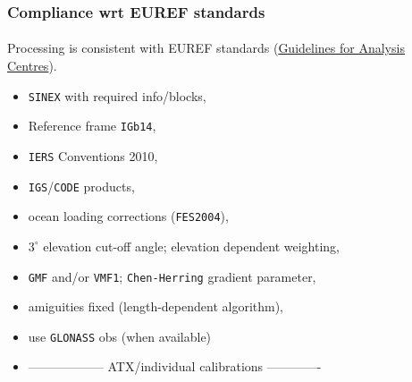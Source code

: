 \begin{frame}\frametitle{Compliance wrt EUREF standards}\framesubtitle{}
\vskip-1.5cm
  Processing is consistent with EUREF standards (\href{http://www.epncb.oma.be/_documentation/guidelines/guidelines_analysis_centres.pdf}{Guidelines for Analysis Centres}).
  \begin{itemize}%
    \item \texttt{SINEX} with required info/blocks,
    \item Reference frame \texttt{IGb14},
    \item \texttt{IERS} Conventions 2010,
    \item \texttt{IGS}/\texttt{CODE} products,
    \item ocean loading corrections (\texttt{FES2004}),
    \item $3^{\circ}$ elevation cut-off angle; elevation dependent weighting,
    \item \texttt{GMF} and/or \texttt{VMF1}; \texttt{Chen-Herring} gradient parameter,
    \item amiguities fixed (length-dependent algorithm),
    \item use \texttt{GLONASS} obs (when available)
    \item ------------------ ATX/individual calibrations  -------------
  \end{itemize}
\end{frame}


